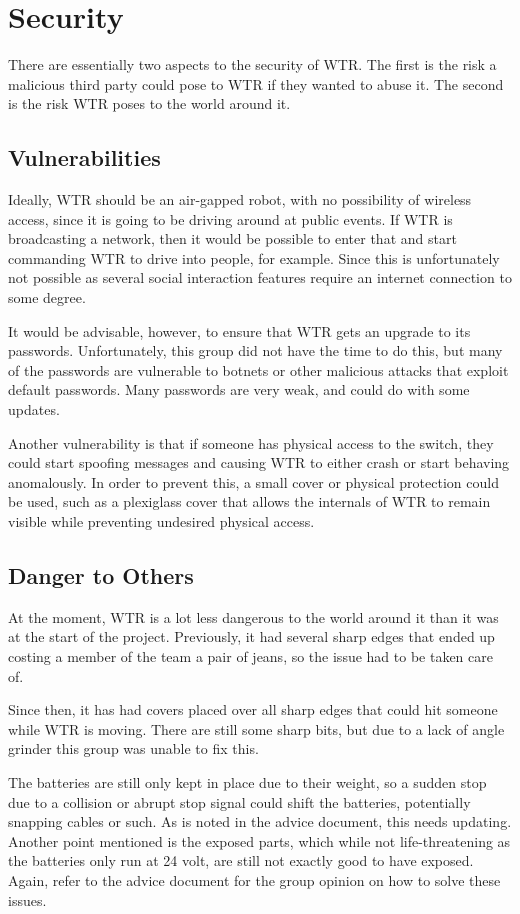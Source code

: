 \section{Security}
There are essentially two aspects to the security of WTR.
The first is the risk a malicious third party could pose to WTR if they wanted to abuse it.
The second is the risk WTR poses to the world around it.

\subsection{Vulnerabilities}
Ideally, WTR should be an air-gapped robot, with no possibility of wireless access, since it is going to be driving around at public events.
If WTR is broadcasting a network, then it would be possible to enter that and start commanding WTR to drive into people, for example.
Since this is unfortunately not possible as several social interaction features require an internet connection to some degree.

It would be advisable, however, to ensure that WTR gets an upgrade to its passwords.
Unfortunately, this group did not have the time to do this, but many of the passwords are vulnerable to botnets or other malicious attacks that exploit default passwords.
Many passwords are very weak, and could do with some updates.

Another vulnerability is that if someone has physical access to the switch, they could start spoofing messages and causing WTR to either crash or start behaving anomalously.
In order to prevent this, a small cover or physical protection could be used, such as a plexiglass cover that allows the internals of WTR to remain visible while preventing undesired physical access.

\subsection{Danger to Others}
At the moment, WTR is a lot less dangerous to the world around it than it was at the start of the project.
Previously, it had several sharp edges that ended up costing a member of the team a pair of jeans, so the issue had to be taken care of.

Since then, it has had covers placed over all sharp edges that could hit someone while WTR is moving.
There are still some sharp bits, but due to a lack of angle grinder this group was unable to fix this.

The batteries are still only kept in place due to their weight, so a sudden stop due to a collision or abrupt stop signal could shift the batteries, potentially snapping cables or such.
As is noted in the advice document, this needs updating.
Another point mentioned is the exposed parts, which while not life-threatening as the batteries only run at 24 volt, are still not exactly good to have exposed.
Again, refer to the advice document for the group opinion on how to solve these issues.

\newpage

